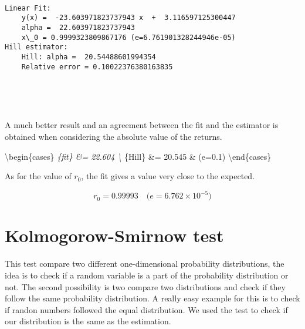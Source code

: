 \documentclass[11pt]{article}
\begin{document}
    \begin{center}
    \end{center}
    { \hspace*{\fill} \\}
    
    \begin{Verbatim}[commandchars=\\\{\}]
Linear Fit:
	y(x) =  -23.603971823737943 x  +  3.116597125300447
	alpha =  22.603971823737943
	x\_0 = 0.9999323809867176 (e=6.761901328244946e-05)
Hill estimator:
	Hill: alpha =  20.54488601994354
	Relative error = 0.10022376380163835

    \end{Verbatim}

    \begin{center}
    \end{center}
    { \hspace*{\fill} \\}
    
    \begin{center}
    \end{center}
    { \hspace*{\fill} \\}
    
    A much better result and an agreement between the fit and the estimator
is obtained when considering the absolute value of the returns.

\textbackslash{}begin\{cases\} \alpha\emph{\{fit\} \&= 22.604
\textbackslash{} \alpha}\{Hill\} \&= 20.545 \& \mbox{(}e=0.1\mbox{)}
\textbackslash{}end\{cases\}

As for the value of \(r_0\), the fit gives a value very close to the
expected.

\[r_0 = 0.99993 \quad \mbox{(}e=6.762\times10^{-5}\mbox{)}\]

    \hypertarget{kolmogorow-smirnow-test}{%
\section{Kolmogorow-Smirnow test}\label{kolmogorow-smirnow-test}}

This test compare two different one-dimensional probability
distributions, the idea is to check if a random variable is a part of
the probability distribution or not. The second possibility is two
compare two distributions and check if they follow the same probability
distribution. A really easy example for this is to check if randon
numbers followed the equal distribution. We used the test to check if
our distribution is the same as the estimation.
\end{document}
